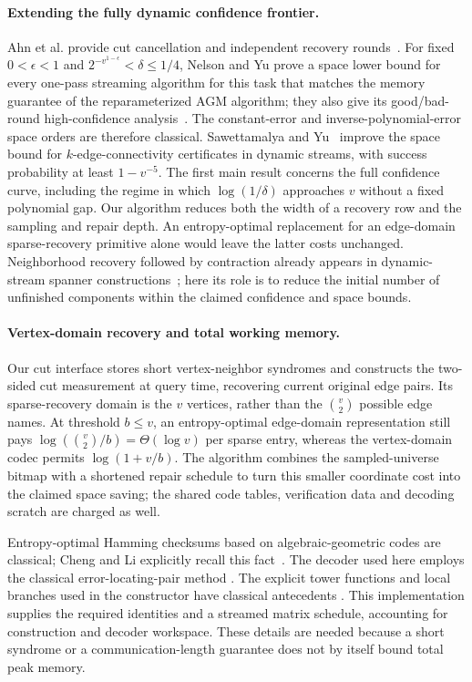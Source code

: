 \documentclass[11pt,letterpaper]{article}
\numberwithin{equation}{section}
\begin{document}
\paragraph{Extending the fully dynamic confidence frontier.}
Ahn et al. provide cut cancellation and independent recovery rounds~\cite[Section~3.1]{AGM2012}.
For fixed $0<\epsilon<1$ and $2^{-v^{1-\epsilon}}<\delta\le1/4$, Nelson and Yu prove a space lower bound for every one-pass streaming algorithm for this task that matches the memory guarantee of the reparameterized AGM algorithm; they also give its good/bad-round high-confidence analysis~\cite[Theorem~3 and Appendix~A]{NelsonYu2019}.
The constant-error and inverse-polynomial-error space orders are therefore classical.
Sawettamalya and Yu~\cite[Theorem~1.3]{SawettamalyaYu2026} improve the space bound for $k$-edge-connectivity certificates in dynamic streams, with success probability at least $1-v^{-5}$.
The first main result concerns the full confidence curve, including the regime in which $\log(1/\delta)$ approaches $v$ without a fixed polynomial gap.
Our algorithm reduces both the width of a recovery row and the sampling and repair depth.
An entropy-optimal replacement for an edge-domain sparse-recovery primitive alone would leave the latter costs unchanged.
Neighborhood recovery followed by contraction already appears in dynamic-stream spanner constructions~\cite[Sections~2 and~4]{KapralovWoodruff2014}; here its role is to reduce the initial number of unfinished components within the claimed confidence and space bounds.

\paragraph{Vertex-domain recovery and total working memory.}
Our cut interface stores short vertex-neighbor syndromes and constructs the two-sided cut measurement at query time, recovering current original edge pairs.
Its sparse-recovery domain is the $v$ vertices, rather than the $\binom{v}{2}$ possible edge names.
At threshold $b\le v$, an entropy-optimal edge-domain representation still pays $\log(\binom{v}{2}/b)=\Theta(\log v)$ per sparse entry, whereas the vertex-domain codec permits $\log(1+v/b)$.
The algorithm combines the sampled-universe bitmap with a shortened repair schedule to turn this smaller coordinate cost into the claimed space saving; the shared code tables, verification data and decoding scratch are charged as well.

Entropy-optimal Hamming checksums based on algebraic-geometric codes are classical; Cheng and Li explicitly recall this fact~\cite[Introduction and Section~3]{ChengLi2021Asymmetric}.
The decoder used here employs the classical error-locating-pair method \cite{Pellikaan92,DuursmaKotter94}.
The explicit tower functions and local branches used in the constructor have classical antecedents \cite{PellikaanStichtenothTorres1998Semigroups,AleshnikovKumarShumStichtenoth2001Splitting}.
This implementation supplies the required identities and a streamed matrix schedule, accounting for construction and decoder workspace.
These details are needed because a short syndrome or a communication-length guarantee does not by itself bound total peak memory.
\end{document}
